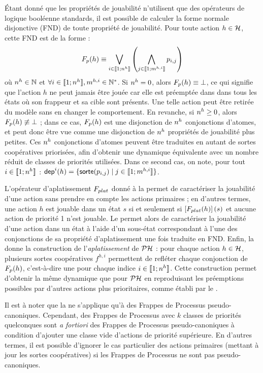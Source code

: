 Étant donné que les propriétés de jouabilité n'utilisent que des opérateurs de logique booléenne
standards, il est possible de calculer la forme normale disjonctive (FND) de toute propriété de
jouabilité. Pour toute action $h \in \mathcal{H}$, cette FND est de la forme :
\[F_{p}(h) \equiv \bigvee_{i \in \llbracket 1; n^{h} \rrbracket}
  \left( \bigwedge_{j \in \llbracket 1; m^{h,i} \rrbracket} p_{i,j} \right)\]
où $n^{h} \in \mathbb{N}$ et $\forall i \in \llbracket 1; n^{h} \rrbracket, m^{h,i} \in \mathbb{N}^*$.
Si $n^{h} = 0$, alors $F_{p}(h) \equiv \bot$, ce qui signifie que l'action $h$ ne peut jamais
être jouée car elle est préemptée dans dans tous les états où son frappeur et sa cible
sont présents.
Une telle action peut être retirée du modèle sans en changer le comportement.
En revanche, si $n^{h} \geq 0$, alors $F_{p}(h) \not\equiv \bot$ ;
dans ce cas, $F_{p}(h)$ est une disjonction de $n^{h}$ conjonctions d'atomes,
et peut donc être vue comme une disjonction de $n^{h}$ propriétés de jouabilité plus petites.
Ces $n^{h}$ conjonctions d'atomes peuvent être traduites en autant de sortes
coopératives priorisées, afin d'obtenir une dynamique équivalente avec un nombre réduit
de classes de priorités utilisées.
Dans ce second cas, on note, pour tout $i \in \llbracket 1; n^{h} \rrbracket$ :
$\mathsf{dep}^{i}(h) = \{ \mathsf{sorte}(p_{i,j}) \mid j \in \llbracket 1; m^{h,i} \rrbracket \}$.

L'opérateur d'aplatissement $F_{plat}$ donné à la 
permet de caractériser la jouabilité d'une action sans prendre en compte les actions primaires ;
en d'autres termes, une action $h$ est jouable dans un état $s$ si et seulement si
$\left[F_{plat}(h)\right](s)$ et aucune action de priorité 1 n'est jouable.
Le  permet alors de caractériser la jouabilité d'une action dans un état
à l'aide d'un sous-état correspondant à l'une des conjonctions de sa propriété
d'aplatissement une fois traduite en FND.
Enfin, la  donne la construction de l'\emph{aplatissement} de $\mathcal{PH}$ :
pour chaque action $h \in \mathcal{H}$, plusieurs sortes coopératives $f^{h,i}$
permettent de refléter chaque conjonction de $F_{p}(h)$,
c'est-à-dire une pour chaque indice $i \in \llbracket 1; n^{h} \rrbracket$.
Cette construction permet d'obtenir la même dynamique que pour $\mathcal{PH}$ en reproduisant
les préemptions possibles par d'autres actions plus prioritaires,
comme établi par le .

Il est à noter que la  ne s'applique qu'à des Frappes de Processus
pseudo-canoniques. Cependant, des Frappes de Processus avec $k$ classes de priorités quelconques
sont \textit{a fortiori} des Frappes de Processus pseudo-canoniques à condition d'ajouter
une classe vide d'actions de priorité supérieure.
En d'autres termes, il est possible d'ignorer le cas particulier des actions primaires
(mettant à jour les sortes coopératives) si les Frappes de Processus ne sont pas
pseudo-canoniques.

